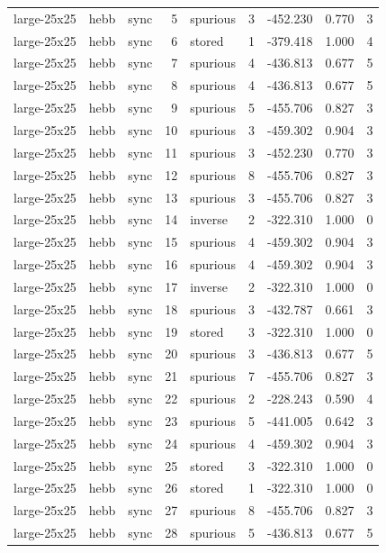 \begin{tabular}{lllrlrrrr}
large-25x25 & hebb & sync & 5 & spurious & 3 & -452.230 & 0.770 & 3 \\
large-25x25 & hebb & sync & 6 & stored & 1 & -379.418 & 1.000 & 4 \\
large-25x25 & hebb & sync & 7 & spurious & 4 & -436.813 & 0.677 & 5 \\
large-25x25 & hebb & sync & 8 & spurious & 4 & -436.813 & 0.677 & 5 \\
large-25x25 & hebb & sync & 9 & spurious & 5 & -455.706 & 0.827 & 3 \\
large-25x25 & hebb & sync & 10 & spurious & 3 & -459.302 & 0.904 & 3 \\
large-25x25 & hebb & sync & 11 & spurious & 3 & -452.230 & 0.770 & 3 \\
large-25x25 & hebb & sync & 12 & spurious & 8 & -455.706 & 0.827 & 3 \\
large-25x25 & hebb & sync & 13 & spurious & 3 & -455.706 & 0.827 & 3 \\
large-25x25 & hebb & sync & 14 & inverse & 2 & -322.310 & 1.000 & 0 \\
large-25x25 & hebb & sync & 15 & spurious & 4 & -459.302 & 0.904 & 3 \\
large-25x25 & hebb & sync & 16 & spurious & 4 & -459.302 & 0.904 & 3 \\
large-25x25 & hebb & sync & 17 & inverse & 2 & -322.310 & 1.000 & 0 \\
large-25x25 & hebb & sync & 18 & spurious & 3 & -432.787 & 0.661 & 3 \\
large-25x25 & hebb & sync & 19 & stored & 3 & -322.310 & 1.000 & 0 \\
large-25x25 & hebb & sync & 20 & spurious & 3 & -436.813 & 0.677 & 5 \\
large-25x25 & hebb & sync & 21 & spurious & 7 & -455.706 & 0.827 & 3 \\
large-25x25 & hebb & sync & 22 & spurious & 2 & -228.243 & 0.590 & 4 \\
large-25x25 & hebb & sync & 23 & spurious & 5 & -441.005 & 0.642 & 3 \\
large-25x25 & hebb & sync & 24 & spurious & 4 & -459.302 & 0.904 & 3 \\
large-25x25 & hebb & sync & 25 & stored & 3 & -322.310 & 1.000 & 0 \\
large-25x25 & hebb & sync & 26 & stored & 1 & -322.310 & 1.000 & 0 \\
large-25x25 & hebb & sync & 27 & spurious & 8 & -455.706 & 0.827 & 3 \\
large-25x25 & hebb & sync & 28 & spurious & 5 & -436.813 & 0.677 & 5 \\

\end{tabular}
